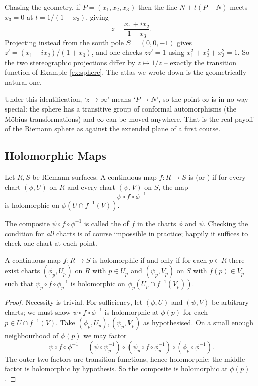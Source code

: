 Chasing the geometry, if $P = (x_1,x_2,x_3)$ then the line $N + t(P - N)$ meets $x_3 = 0$
at $t = 1/(1-x_3)$, giving
$$
z = \frac{x_1 + i x_2}{1 - x_3}.
$$
Projecting instead from the south pole $S = (0,0,-1)$ gives $z' = (x_1 - ix_2)/(1 + x_3)$,
and one checks $z z' = 1$ using $x_1^2 + x_2^2 + x_3^2 = 1$. So the two stereographic
projections differ by $z \mapsto 1/z$ -- exactly the transition function of Example
\ref{ex:sphere}. The atlas we wrote down is the geometrically natural one.

\begin{remark}
	Under this identification, `$z \to \infty$' means `$P \to N$', so the point $\infty$
	is in no way special: the sphere has a transitive group of conformal automorphisms
	(the M\"obius transformations) and $\infty$ can be moved anywhere. That is the real
	payoff of the Riemann sphere as against the extended plane of a first course.
\end{remark}

\subsection{Holomorphic Maps}

\begin{definition}
	Let $R, S$ be Riemann surfaces. A continuous map $f : R \to S$ is
	 (or ) if for every chart $(\phi, U)$ on $R$ and
	every chart $(\psi, V)$ on $S$, the map
	$$
	\psi \circ f \circ \phi^{-1}
	$$
	is holomorphic on $\phi(U \cap f^{-1}(V))$.
\end{definition}

The composite $\psi \circ f \circ \phi^{-1}$ is called the  of
$f$ in the charts $\phi$ and $\psi$. Checking the condition for \emph{all} charts is of
course impossible in practice; happily it suffices to check one chart at each point.

\begin{lemma}\label{lem:holcheckone}
	A continuous map $f : R \to S$ is holomorphic if and only if for each $p \in R$ there
	exist charts $(\phi_p, U_p)$ on $R$ with $p \in U_p$ and $(\psi_p, V_p)$ on $S$ with
	$f(p) \in V_p$ such that $\psi_p \circ f \circ \phi_p^{-1}$ is holomorphic on
	$\phi_p(U_p \cap f^{-1}(V_p))$.
\end{lemma}

\begin{proof}
	Necessity is trivial. For sufficiency, let $(\phi, U)$ and $(\psi, V)$ be arbitrary
	charts; we must show $\psi \circ f \circ \phi^{-1}$ is holomorphic at $\phi(p)$ for
	each $p \in U \cap f^{-1}(V)$. Take $(\phi_p, U_p), (\psi_p, V_p)$ as hypothesised.
	On a small enough neighbourhood of $\phi(p)$ we may factor
	$$
	\psi \circ f \circ \phi^{-1} = (\psi \circ \psi_p^{-1}) \circ (\psi_p \circ f \circ \phi_p^{-1}) \circ (\phi_p \circ \phi^{-1}).
	$$
	The outer two factors are transition functions, hence holomorphic; the middle factor is
	holomorphic by hypothesis. So the composite is holomorphic at $\phi(p)$.
\end{proof}

